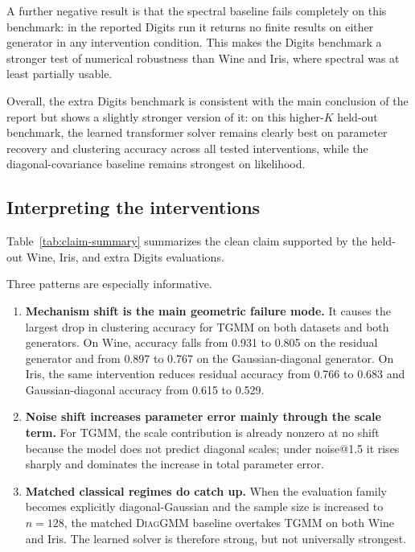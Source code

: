 \documentclass{article}
\newcommand{\tgmm}{\textsc{TGMM}}
\newcommand{\diaggmm}{\textsc{DiagGMM}}
\begin{document}
A further negative result is that the spectral baseline fails completely on this benchmark: in the reported Digits run it returns no finite results on either generator in any intervention condition. This makes the Digits benchmark a stronger test of numerical robustness than Wine and Iris, where spectral was at least partially usable.

Overall, the extra Digits benchmark is consistent with the main conclusion of the report but shows a slightly stronger version of it: on this higher-$K$ held-out benchmark, the learned transformer solver remains clearly best on parameter recovery and clustering accuracy across all tested interventions, while the diagonal-covariance baseline remains strongest on likelihood.

\subsection{Interpreting the interventions}
Table~\ref{tab:claim-summary} summarizes the clean claim supported by the held-out Wine, Iris, and extra Digits evaluations.

Three patterns are especially informative.
\begin{enumerate}[leftmargin=1.4em]
    \item \textbf{Mechanism shift is the main geometric failure mode.} It causes the largest drop in clustering accuracy for \tgmm{} on both datasets and both generators. On Wine, accuracy falls from 0.931 to 0.805 on the residual generator and from 0.897 to 0.767 on the Gaussian-diagonal generator. On Iris, the same intervention reduces residual accuracy from 0.766 to 0.683 and Gaussian-diagonal accuracy from 0.615 to 0.529.
    \item \textbf{Noise shift increases parameter error mainly through the scale term.} For \tgmm{}, the scale contribution is already nonzero at no shift because the model does not predict diagonal scales; under noise@1.5 it rises sharply and dominates the increase in total parameter error.
    \item \textbf{Matched classical regimes do catch up.} When the evaluation family becomes explicitly diagonal-Gaussian and the sample size is increased to $n=128$, the matched \diaggmm{} baseline overtakes TGMM on both Wine and Iris. The learned solver is therefore strong, but not universally strongest.
\end{enumerate}
\end{document}
